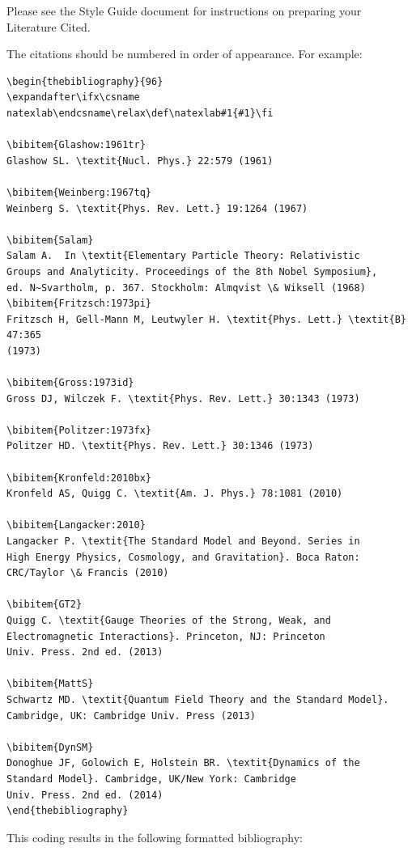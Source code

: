 \documentclass{ar-1col}
\begin{document}
\noindent
Please see the Style Guide document for instructions on preparing your Literature Cited.

The citations should be numbered in order of appearance. For example:





\begin{verbatim}
\begin{thebibliography}{96}
\expandafter\ifx\csname
natexlab\endcsname\relax\def\natexlab#1{#1}\fi

\bibitem{Glashow:1961tr}
Glashow SL. \textit{Nucl. Phys.} 22:579 (1961)

\bibitem{Weinberg:1967tq}
Weinberg S. \textit{Phys. Rev. Lett.} 19:1264 (1967)

\bibitem{Salam}
Salam A.  In \textit{Elementary Particle Theory: Relativistic
Groups and Analyticity. Proceedings of the 8th Nobel Symposium},
ed. N~Svartholm, p. 367. Stockholm: Almqvist \& Wiksell (1968)
\bibitem{Fritzsch:1973pi}
Fritzsch H, Gell-Mann M, Leutwyler H. \textit{Phys. Lett.} \textit{B} 47:365
(1973)

\bibitem{Gross:1973id}
Gross DJ, Wilczek F. \textit{Phys. Rev. Lett.} 30:1343 (1973)

\bibitem{Politzer:1973fx}
Politzer HD. \textit{Phys. Rev. Lett.} 30:1346 (1973)

\bibitem{Kronfeld:2010bx}
Kronfeld AS, Quigg C. \textit{Am. J. Phys.} 78:1081 (2010)

\bibitem{Langacker:2010}
Langacker P. \textit{The Standard Model and Beyond. Series in
High Energy Physics, Cosmology, and Gravitation}. Boca Raton:
CRC/Taylor \& Francis (2010)

\bibitem{GT2}
Quigg C. \textit{Gauge Theories of the Strong, Weak, and
Electromagnetic Interactions}. Princeton, NJ: Princeton
Univ. Press. 2nd ed. (2013)

\bibitem{MattS}
Schwartz MD. \textit{Quantum Field Theory and the Standard Model}.
Cambridge, UK: Cambridge Univ. Press (2013)

\bibitem{DynSM}
Donoghue JF, Golowich E, Holstein BR. \textit{Dynamics of the
Standard Model}. Cambridge, UK/New York: Cambridge
Univ. Press. 2nd ed. (2014)
\end{thebibliography}
\end{verbatim}

This coding results in the following formatted bibliography:
\end{document}
